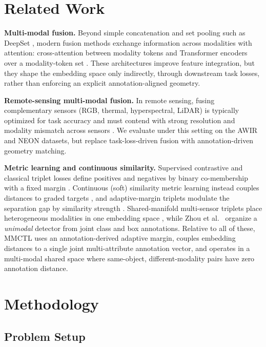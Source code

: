 \documentclass[10pt,twocolumn,letterpaper]{article}
\renewcommand{\red}[1]{#1}
\begin{document}
\section{Related Work}
\label{sec:related}

\red{\noindent\textbf{Multi-modal fusion.} Beyond simple concatenation and set pooling such as DeepSet \cite{reiter2020deep}, modern fusion methods exchange information across modalities with attention: cross-attention between modality tokens \cite{lu2019vilbert} and Transformer encoders over a modality-token set \cite{vaswani2017attention}. These architectures improve feature integration, but they shape the embedding space only indirectly, through downstream task losses, rather than enforcing an explicit annotation-aligned geometry.}

\red{\noindent\textbf{Remote-sensing multi-modal fusion.} In remote sensing, fusing complementary sensors (RGB, thermal, hyperspectral, LiDAR) is typically optimized for task accuracy \cite{chen2024novel,bai2025task,houdre2025promm} and must contend with strong resolution and modality mismatch across sensors \cite{du2019multiresolution}. We evaluate under this setting on the AWIR and NEON datasets, but replace task-loss-driven fusion with annotation-driven geometry matching.}

\red{\noindent\textbf{Metric learning and continuous similarity.} Supervised contrastive and classical triplet losses define positives and negatives by binary co-membership with a fixed margin \cite{khosla2020supervised,dutt2022shared}. Continuous (soft) similarity metric learning instead couples distances to graded targets \cite{kim2019deep}, and adaptive-margin triplets modulate the separation gap by similarity strength \cite{ha2021adaptive}. Shared-manifold multi-sensor triplets place heterogeneous modalities in one embedding space \cite{dutt2022shared}, while Zhou et al.\ \cite{zhou2025multi} organize a \emph{unimodal} detector from joint class and box annotations. Relative to all of these, MMCTL uses an annotation-derived adaptive margin, couples embedding distances to a single joint multi-attribute annotation vector, and operates in a multi-modal shared space where same-object, different-modality pairs have zero annotation distance.}

\section{Methodology}
\label{sec:methodology}

\subsection{Problem Setup}
\label{subsec:problem-setup}
\end{document}
